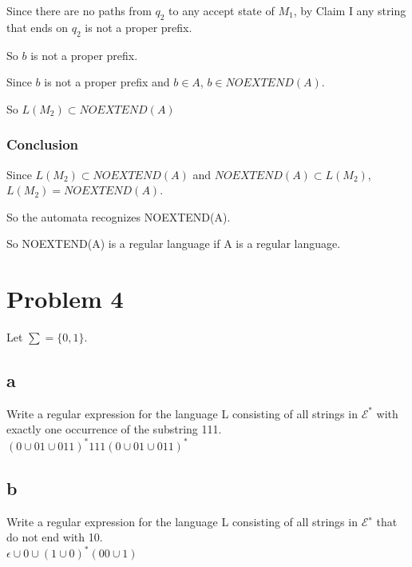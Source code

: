 \documentclass[letterpaper, 11pt]{article}
\begin{document}
Since there are no paths from $q_2$ to any accept state of $M_1$, by Claim I any string that ends on $q_2$ is not a proper prefix.

So $b$ is not a proper prefix.

Since $b$ is not a proper prefix and $b \in A$, $b \in NOEXTEND(A)$.

So $L(M_2) \subset NOEXTEND(A)$

\subsubsection*{Conclusion}
Since $L(M_2) \subset NOEXTEND(A)$ and $NOEXTEND(A) \subset L(M_2)$, $L(M_2) = NOEXTEND(A)$.

So the automata recognizes NOEXTEND(A).

So NOEXTEND(A) is a regular language if A is a regular language.
\newpage
\section{Problem 4}
Let $\sum = \{0, 1\}$.

\subsection*{a}
Write a regular expression for the language L consisting of all strings in $\mathcal{E}^*$ with exactly one occurrence of the substring 111.\\

$(0 \cup 01 \cup 011)^*111(0 \cup 01 \cup 011)^*$
\subsection*{b}
Write a regular expression for the language L consisting of all strings in $\mathcal{E}^∗$ that do not end with 10.\\

$\epsilon \cup 0 \cup (1 \cup 0)^*(00 \cup 1)$
\end{document}
